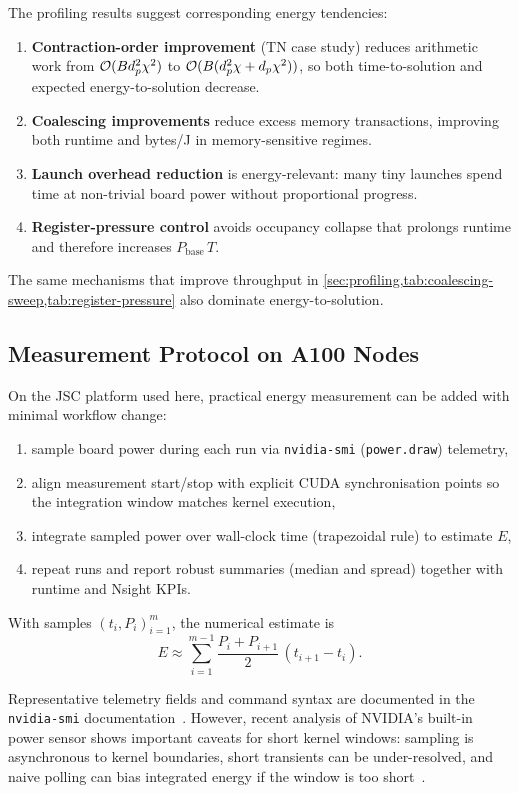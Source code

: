 The profiling results suggest corresponding energy tendencies:
\begin{enumerate}
  \item \textbf{Contraction-order improvement} (TN case study) reduces
  arithmetic work from $\mathcal{O}(Bd_p^2\chi^2)$ to
  $\mathcal{O}(B(d_p^2\chi+d_p\chi^2))$, so both time-to-solution and expected
  energy-to-solution decrease.
  \item \textbf{Coalescing improvements} reduce excess memory transactions,
  improving both runtime and bytes/J in memory-sensitive regimes.
  \item \textbf{Launch overhead reduction} is energy-relevant: many tiny
  launches spend time at non-trivial board power without proportional progress.
  \item \textbf{Register-pressure control} avoids occupancy collapse that
  prolongs runtime and therefore increases $P_{\mathrm{base}}\,T$.
\end{enumerate}

The same mechanisms that improve throughput in
\cref{sec:profiling,tab:coalescing-sweep,tab:register-pressure} also dominate
energy-to-solution.

\subsection{Measurement Protocol on A100 Nodes}

On the JSC platform used here, practical energy measurement can be added with
minimal workflow change:
\begin{enumerate}
  \item sample board power during each run via \texttt{nvidia-smi}
  (\texttt{power.draw}) telemetry,
  \item align measurement start/stop with explicit CUDA synchronisation points
  so the integration window matches kernel execution,
  \item integrate sampled power over wall-clock time (trapezoidal rule) to
  estimate $E$,
  \item repeat runs and report robust summaries (median and spread) together
  with runtime and Nsight KPIs.
\end{enumerate}

With samples $(t_i,P_i)_{i=1}^m$, the numerical estimate is
\[
  E \approx \sum_{i=1}^{m-1}\frac{P_i+P_{i+1}}{2}\,(t_{i+1}-t_i).
\]

Representative telemetry fields and command syntax are documented in the
\texttt{nvidia-smi} documentation~\cite{nvidia-smi-doc}. However, recent
analysis of NVIDIA's built-in power sensor shows important caveats for short
kernel windows: sampling is asynchronous to kernel boundaries, short transients
can be under-resolved, and naive polling can bias integrated energy if the
window is too short~\cite{yang2024parttime-power-arxiv,yang2024gpu-energy-sc24}.

